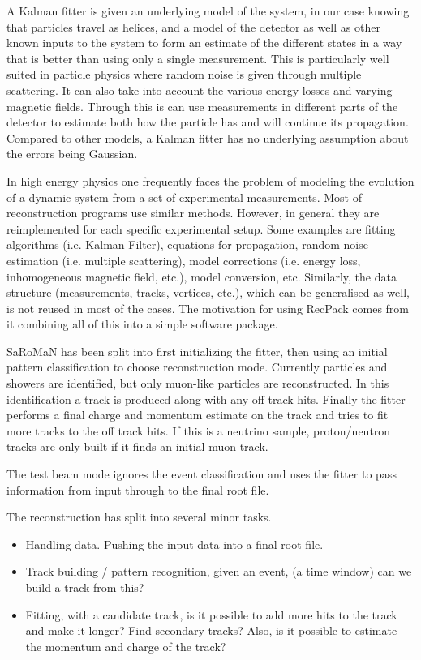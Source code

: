 A Kalman fitter is given an underlying model of the system, in our case knowing that particles travel as helices, and a model of the detector as well as other known inputs to the system to form an estimate of the different states in a way that is better than using only a single measurement. This is particularly well suited in particle physics where random noise is given through multiple scattering. It can also take into account the various energy losses and varying magnetic fields. Through this is can use measurements in different parts of the detector to estimate both how the particle has and will continue its propagation. Compared to other models, a Kalman fitter has no underlying assumption about the errors being Gaussian.

In high energy physics one frequently faces the problem of modeling the evolution of a dynamic system from a set of experimental measurements. Most of reconstruction programs use similar methods. However, in general they are reimplemented for each specific experimental setup. Some examples are fitting algorithms (i.e. Kalman Filter), equations for propagation, random noise estimation (i.e. multiple scattering), model corrections (i.e. energy loss, inhomogeneous magnetic field, etc.), model conversion, etc. Similarly, the data structure (measurements, tracks, vertices, etc.), which can be generalised as well, is not reused in most of the cases. The motivation for using RecPack comes from it combining all of this into a simple software package.

SaRoMaN has been split into first initializing the fitter, then using an initial pattern classification to choose reconstruction mode. Currently particles and showers are identified, but only muon-like particles are reconstructed. In this identification a track is produced along with any off track hits. Finally the fitter performs a final charge and momentum estimate on the track and tries to fit more tracks to the off track hits. If this is a neutrino sample, proton/neutron tracks are only built if it finds an initial muon track.

The test beam mode ignores the event classification and uses the fitter to pass information from input through to the final root file.

The reconstruction has split into several minor tasks.
\begin{itemize}
\item Handling data. Pushing the input data into a final root file.
\item Track building / pattern recognition, given an event, (a time window) can we build a track from this?
\item Fitting, with a candidate track, is it possible to add more hits to the track and make it longer? Find secondary tracks? Also, is it possible to estimate the momentum and charge of the track?
\end{itemize}


